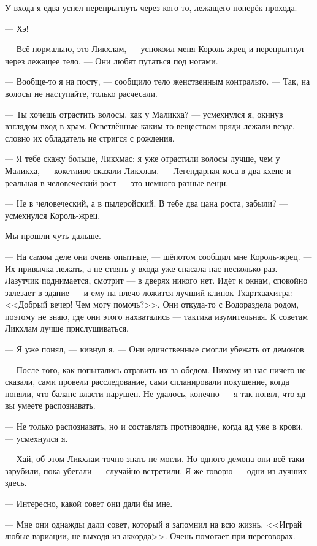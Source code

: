 У входа я едва успел перепрыгнуть через кого-то, лежащего поперёк прохода.

--- Хэ!

--- Всё нормально, это Ликхлам, --- успокоил меня Король-жрец и перепрыгнул через лежащее тело.
--- Они любят путаться под ногами.

--- Вообще-то я на посту, --- сообщило тело женственным контральто.
--- Так, на волосы не наступайте, только расчесали.

--- Ты хочешь отрастить волосы, как у Маликха? --- усмехнулся я, окинув взглядом вход в храм.
Осветлённые каким-то веществом пряди лежали везде, словно их обладатель не стригся с рождения.

--- Я тебе скажу больше, Ликхмас: я уже отрастили волосы лучше, чем у Маликха, --- кокетливо сказали Ликхлам.
--- Легендарная коса в два кхене и реальная в человеческий рост --- это немного разные вещи.

--- Не в человеческий, а в пылеройский.
В тебе два цана роста, забыли? --- усмехнулся Король-жрец.

Мы прошли чуть дальше.

--- На самом деле они очень опытные, --- шёпотом сообщил мне Король-жрец.
--- Их привычка лежать, а не стоять у входа уже спасала нас несколько раз.
Лазутчик поднимается, смотрит --- в дверях никого нет.
Идёт к окнам, спокойно залезает в здание --- и ему на плечо ложится лучший клинок Тхартхаахитра: <<Добрый вечер!
Чем могу помочь?>>.
Они откуда-то с Водораздела родом, поэтому не знаю, где они этого нахватались --- тактика изумительная.
К советам Ликхлам лучше прислушиваться.

--- Я уже понял, --- кивнул я.
--- Они единственные смогли убежать от демонов.

--- После того, как попытались отравить их за обедом.
Никому из нас ничего не сказали, сами провели расследование, сами спланировали покушение, когда поняли, что баланс власти нарушен.
Не удалось, конечно --- я так понял, что яд вы умеете распознавать.

--- Не только распознавать, но и составлять противоядие, когда яд уже в крови, --- усмехнулся я.

--- Хай, об этом Ликхлам точно знать не могли.
Но одного демона они всё-таки зарубили, пока убегали --- случайно встретили.
Я же говорю --- одни из лучших здесь.

--- Интересно, какой совет они дали бы мне.

--- Мне они однажды дали совет, который я запомнил на всю жизнь.
<<Играй любые вариации, не выходя из аккорда>>.
Очень помогает при переговорах.

